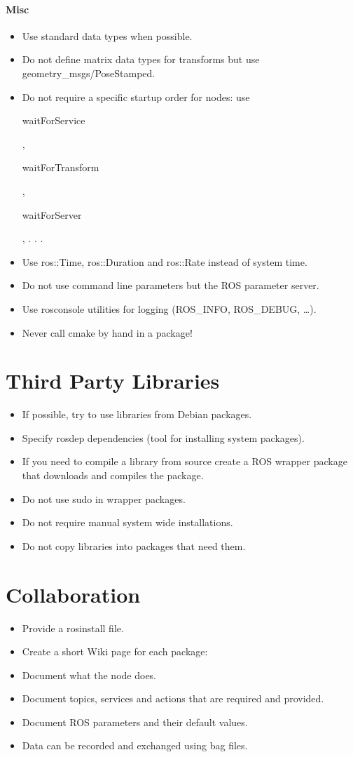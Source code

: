 \paragraph{Misc}
\begin{itemize}
\item Use standard data types when possible.
\item Do not define matrix data types for transforms but use geometry\_msgs/PoseStamped.
\item Do not require a specific startup order for nodes: use \begin{tt}waitForService\end{tt}, \begin{tt}waitForTransform\end{tt}, \begin{tt}waitForServer\end{tt}, . . .
\item Use ros::Time, ros::Duration and ros::Rate instead of system time.
\item Do not use command line parameters but the ROS parameter server.
\item Use rosconsole utilities for logging (ROS\_INFO, ROS\_DEBUG, \ldots).
\item Never call cmake by hand in a package!
\end{itemize}


\section{Third Party Libraries}
\begin{itemize}
\item If possible, try to use libraries from Debian packages.
\item Specify rosdep dependencies (tool for installing system packages).
\item If you need to compile a library from source create a ROS wrapper
package that downloads and compiles the package.
\item Do not use sudo in wrapper packages.
\item Do not require manual system wide installations.
\item Do not copy libraries into packages that need them.
\end{itemize}


\section{Collaboration}
\begin{itemize}
\item Provide a rosinstall file.
\item Create a short Wiki page for each package:
\item Document what the node does.
\item Document topics, services and actions that are required and
provided.
\item Document ROS parameters and their default values.
\item Data can be recorded and exchanged using bag files.
\end{itemize}

